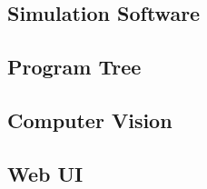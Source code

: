 \subsection{Simulation Software}
\label{subsec:simulation-software}


\subsection{Program Tree}
\label{subsec:program-tree}



\subsection{Computer Vision}
\label{subsec:computer-vision}




\subsection{Web UI}
\label{subsec:web-ui}



